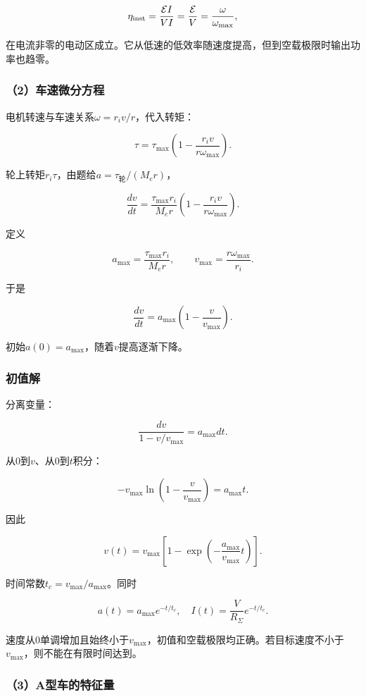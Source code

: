 \documentclass[12pt,a4paper,fontset=fandol]{ctexart}
\begin{document}
\[
\eta_{\rm inst}=\frac{\mathcal EI}{VI}
=\frac{\mathcal E}{V}
=\frac\omega{\omega_{\max}},
\]

在电流非零的电动区成立。它从低速的低效率随速度提高，但到空载极限时输出功率也趋零。

\subsubsection{（2）车速微分方程}\label{ux8f66ux901fux5faeux5206ux65b9ux7a0b}

电机转速与车速关系\(\omega=r_iv/r\)，代入转矩：

\[
\tau=\tau_{\max}
\left(1-\frac{r_iv}{r\omega_{\max}}\right).
\]

轮上转矩\(r_i\tau\)，由题给\(a=\tau_{\text{轮}}/(M_er)\)，

\[
\frac{dv}{dt}
=\frac{\tau_{\max}r_i}{M_er}
\left(1-\frac{r_iv}{r\omega_{\max}}\right).
\]

定义

\[
\boxed{a_{\max}=\frac{\tau_{\max}r_i}{M_er}},
\qquad
\boxed{v_{\max}=\frac{r\omega_{\max}}{r_i}}.
\]

于是

\[
\frac{dv}{dt}=a_{\max}\left(1-\frac v{v_{\max}}\right).
\]

初始\(a(0)=a_{\max}\)，随着\(v\)提高逐渐下降。

\subsubsection{初值解}\label{ux521dux503cux89e3}

分离变量：

\[
\frac{dv}{1-v/v_{\max}}=a_{\max}dt.
\]

从0到\(v\)、从0到\(t\)积分：

\[
-v_{\max}\ln\left(1-\frac v{v_{\max}}\right)
=a_{\max}t.
\]

因此

\[
\boxed{
v(t)=v_{\max}
\left[1-\exp\left(-\frac{a_{\max}}{v_{\max}}t\right)\right]}.
\]

时间常数\(t_c=v_{\max}/a_{\max}\)。同时

\[
a(t)=a_{\max}e^{-t/t_c},\quad
I(t)=\frac V{R_\Sigma}e^{-t/t_c}.
\]

速度从0单调增加且始终小于\(v_{\max}\)，初值和空载极限均正确。若目标速度不小于\(v_{\max}\)，则不能在有限时间达到。

\subsubsection{（3）A型车的特征量}\label{aux578bux8f66ux7684ux7279ux5f81ux91cf}
\end{document}
